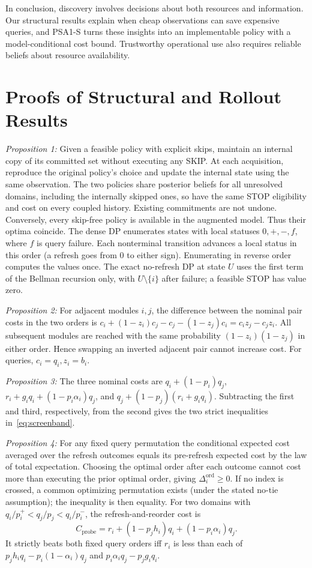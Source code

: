 \documentclass[conference]{IEEEtran}
\begin{document}
In conclusion, discovery involves decisions about both resources and information. Our structural results explain when cheap observations can save expensive queries, and PSA1-S turns these insights into an implementable policy with a model-conditional cost bound. Trustworthy operational use also requires reliable beliefs about resource availability.

\clearpage
\appendices
\section{Proofs of Structural and Rollout Results}
\label{app:proofs}
\textit{Proposition 1:} Given a feasible policy with explicit skips, maintain an internal copy of its committed set without executing any SKIP. At each acquisition, reproduce the original policy's choice and update the internal state using the same observation. The two policies share posterior beliefs for all unresolved domains, including the internally skipped ones, so have the same STOP eligibility and cost on every coupled history. Existing commitments are not undone. Conversely, every skip-free policy is available in the augmented model. Thus their optima coincide. The dense DP enumerates states with local statuses $0,+,-,f$, where $f$ is query failure. Each nonterminal transition advances a local status in this order (a refresh goes from $0$ to either sign). Enumerating in reverse order computes the values once. The exact no-refresh DP at state $U$ uses the first term of the Bellman recursion only, with $U\setminus\{i\}$ after failure; a feasible STOP has value zero.

\textit{Proposition 2:} For adjacent modules $i,j$, the difference between the nominal pair costs in the two orders is $c_i+(1-z_i)c_j-c_j-(1-z_j)c_i=c_i z_j-c_j z_i$. All subsequent modules are reached with the same probability $(1-z_i)(1-z_j)$ in either order. Hence swapping an inverted adjacent pair cannot increase cost. For queries, $c_i=q_i,z_i=b_i$.

\textit{Proposition 3:} The three nominal costs are $q_i+(1-p_i)q_j$, $r_i+g_iq_i+(1-p_i\alpha_i)q_j$, and $q_j+(1-p_j)(r_i+g_iq_i)$. Subtracting the first and third, respectively, from the second gives the two strict inequalities in~\eqref{eq:screenband}.

\textit{Proposition 4:} For any fixed query permutation the conditional expected cost averaged over the refresh outcomes equals its pre-refresh expected cost by the law of total expectation. Choosing the optimal order after each outcome cannot cost more than executing the prior optimal order, giving $\Delta_i^{\mathrm{ord}}\ge0$. If no index is crossed, a common optimizing permutation exists (under the stated no-tie assumption); the inequality is then equality. For two domains with $q_i/p_i^+<q_j/p_j<q_i/p_i^-$, the refresh-and-reorder cost is
\begin{equation}
 C_{\mathrm{probe}}=r_i+(1-p_jh_i)q_i+(1-p_i\alpha_i)q_j.
\end{equation}
It strictly beats both fixed query orders iff $r_i$ is less than each of $p_jh_iq_i-p_i(1-\alpha_i)q_j$ and $p_i\alpha_iq_j-p_jg_iq_i$.
\end{document}
